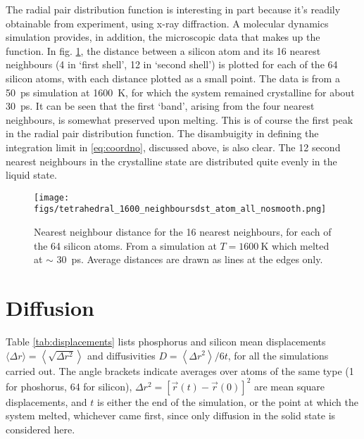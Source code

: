 \documentclass[11pt,bibliography=totoc,index=totoc]{scrbook}   %
\begin{document}
The radial pair distribution function is interesting in part because it's readily obtainable from experiment, using x-ray diffraction.
A molecular dynamics simulation provides, in addition, the microscopic data that makes up the function.
In fig. \ref{fig:nn_melting}, the distance between a silicon atom and its 16 nearest neighbours (4 in `first shell', 12 in `second shell') is plotted for each of the 64 silicon atoms, with each distance plotted as a small point.
The data is from a 50~ps simulation at 1600~K, for which the system remained crystalline for about 30~ps.
It can be seen that the first `band', arising from the four nearest neighbours, is somewhat preserved upon melting. 
This is of course the first peak in the radial pair distribution function.
The disambuigity in defining the integration limit in \eqref{eq:coordno}, discussed above, is also clear. 
The 12 second nearest neighbours in the crystalline state are distributed quite evenly in the liquid state.

\begin{figure}[htbp]
  \centering
  \texttt{[image: figs/tetrahedral\_1600\_neighboursdst\_atom\_all\_nosmooth.png]}
  \caption{Nearest neighbour distance for the 16 nearest neighbours, for each of the 64 silicon atoms.
      From a simulation at $T=\SI{1600}{\kelvin}$ which melted at $\sim$ 30~ps.
      Average distances are drawn as lines at the edges only.
  }
  \label{fig:nn_melting}
\end{figure}

%
\section{Diffusion}\label{sec:diffusion-results}
%

Table \ref{tab:displacements} lists phosphorus and silicon mean displacements 
$\langle\Delta r\rangle = \left\langle\sqrt{\Delta r^2}\right\rangle$ and diffusivities $D = \left\langle\Delta r^2\right\rangle / 6t$, 
for all the simulations carried out.
The angle brackets indicate averages over atoms of the same type (1 for phoshorus, 64 for silicon), 
$\Delta r^2 = [\vec{r}(t) - \vec{r}(0)]^2$ are mean square displacements,
and $t$ is either the end of the simulation, or the point at which the system melted, whichever came first, 
since only diffusion in the solid state is considered here.
\end{document}
